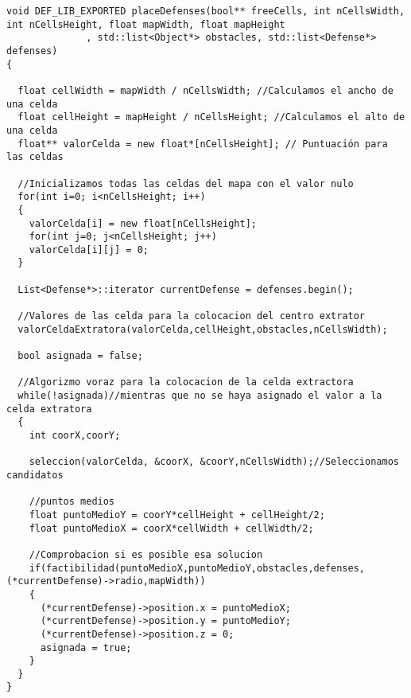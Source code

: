 \begin{lstlisting}
void DEF_LIB_EXPORTED placeDefenses(bool** freeCells, int nCellsWidth, int nCellsHeight, float mapWidth, float mapHeight
              , std::list<Object*> obstacles, std::list<Defense*> defenses) 
{

  float cellWidth = mapWidth / nCellsWidth; //Calculamos el ancho de una celda
  float cellHeight = mapHeight / nCellsHeight; //Calculamos el alto de una celda
  float** valorCelda = new float*[nCellsHeight]; // Puntuación para las celdas

  //Inicializamos todas las celdas del mapa con el valor nulo
  for(int i=0; i<nCellsHeight; i++)
  {
    valorCelda[i] = new float[nCellsHeight];
    for(int j=0; j<nCellsHeight; j++)
    valorCelda[i][j] = 0;
  }

  List<Defense*>::iterator currentDefense = defenses.begin();

  //Valores de las celda para la colocacion del centro extrator
  valorCeldaExtratora(valorCelda,cellHeight,obstacles,nCellsWidth);
    
  bool asignada = false;

  //Algorizmo voraz para la colocacion de la celda extractora
  while(!asignada)//mientras que no se haya asignado el valor a la celda extratora
  {
    int coorX,coorY;

    seleccion(valorCelda, &coorX, &coorY,nCellsWidth);//Seleccionamos candidatos
    
    //puntos medios
    float puntoMedioY = coorY*cellHeight + cellHeight/2;
    float puntoMedioX = coorX*cellWidth + cellWidth/2;

    //Comprobacion si es posible esa solucion
    if(factibilidad(puntoMedioX,puntoMedioY,obstacles,defenses,(*currentDefense)->radio,mapWidth))
    {   
      (*currentDefense)->position.x = puntoMedioX;
      (*currentDefense)->position.y = puntoMedioY;
      (*currentDefense)->position.z = 0; 
      asignada = true;
    }
  }
}
\end{lstlisting}
